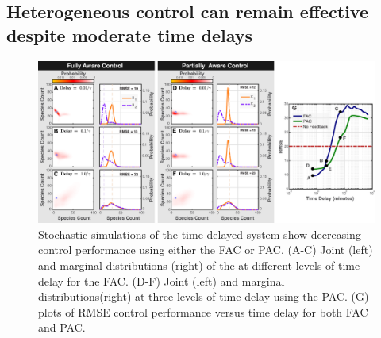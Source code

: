 \documentclass[12pt]{iopart}
\begin{document}


\subsection{Heterogeneous control can remain effective despite moderate time delays}
\begin{figure}
\begin{center}
\includegraphics[width=1\textwidth]{TimeDelay.pdf}
\vspace{-0.1in}
\caption{Stochastic simulations of the time delayed system show decreasing control performance using either the FAC or PAC. (A-C) Joint (left) and marginal distributions (right) of the at different levels of time delay for the FAC. (D-F) Joint (left) and marginal distributions(right) at three levels of time delay using the PAC.  (G) plots of RMSE control performance versus time delay for both FAC and PAC.}
\label{Time}
\end{center}
\vspace{-0.2in}
\end{figure}
\end{document}
